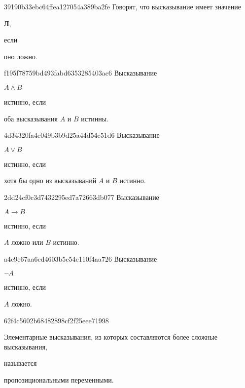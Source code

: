 \begin{note}{39190b33ebc64ffea127054a389ba2fe}
    Говорят, что высказывание имеет значение \begin{icloze}{2}\textbf{Л},\end{icloze} если \begin{icloze}{1}оно ложно.\end{icloze}
\end{note}

\begin{note}{f195f78759bd493fabd6353285403ac6}
    Высказывание \begin{icloze}{2}\({ A \land B }\)\end{icloze} истинно, если \begin{icloze}{1}оба высказывания \({ A }\) и \({ B }\) истинны.\end{icloze}
\end{note}

\begin{note}{4d34320fa4e049b3b9d25a44d54c51d6}
    Высказывание \begin{icloze}{2}\({ A \lor B }\)\end{icloze} истинно, если \begin{icloze}{1}хотя бы одно из высказываний \({ A }\) и \({ B }\) истинно.\end{icloze}
\end{note}

\begin{note}{2dd24cf0c3d7432295ed7a72663db077}
    Высказывание \begin{icloze}{2}\({ A \to B }\)\end{icloze} истинно, если \begin{icloze}{1}\({ A }\) ложно или \({ B }\) истинно.\end{icloze}
\end{note}

\begin{note}{a4c9e67aa6cd4603b5c54c110f4aa726}
    Высказывание \begin{icloze}{2}\({ \lnot A }\)\end{icloze} истинно, если \begin{icloze}{1}\({ A }\) ложно.\end{icloze}
\end{note}

\begin{note}{62f4c5602b68482898cf2f25eee71998}
    \begin{icloze}{2}Элементарные высказывания, из которых составляются более сложные высказывания,\end{icloze} называется \begin{icloze}{1}пропозициональными переменными.\end{icloze}
\end{note}

